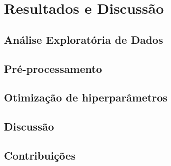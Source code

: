 \chapter{Resultados e Discussão}

\section{Análise Exploratória de Dados}

\section{Pré-processamento}
\label{preprocessing}

\section{Otimização de hiperparâmetros}

\section{Discussão}

\section{Contribuições}
